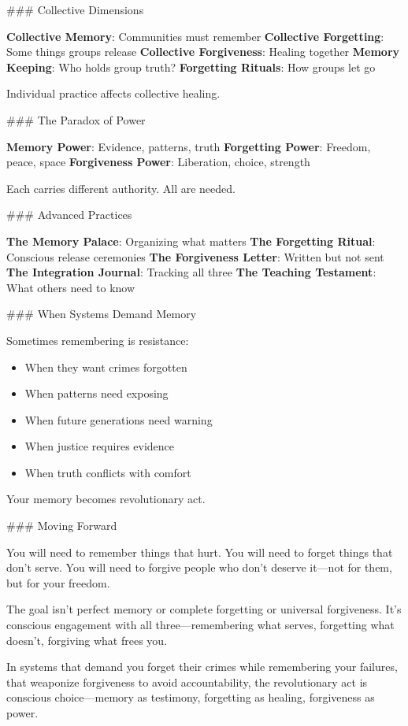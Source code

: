 \documentclass[12pt]{book}
\begin{document}
\#\#\# Collective Dimensions

\textbf{Collective Memory}: Communities must remember
\textbf{Collective Forgetting}: Some things groups release
\textbf{Collective Forgiveness}: Healing together
\textbf{Memory Keeping}: Who holds group truth?
\textbf{Forgetting Rituals}: How groups let go

Individual practice affects collective healing.

\#\#\# The Paradox of Power

\textbf{Memory Power}: Evidence, patterns, truth
\textbf{Forgetting Power}: Freedom, peace, space
\textbf{Forgiveness Power}: Liberation, choice, strength

Each carries different authority. All are needed.

\#\#\# Advanced Practices

\textbf{The Memory Palace}: Organizing what matters
\textbf{The Forgetting Ritual}: Conscious release ceremonies
\textbf{The Forgiveness Letter}: Written but not sent
\textbf{The Integration Journal}: Tracking all three
\textbf{The Teaching Testament}: What others need to know

\#\#\# When Systems Demand Memory

Sometimes remembering is resistance:

\begin{itemize}
\item When they want crimes forgotten
\item When patterns need exposing
\item When future generations need warning
\item When justice requires evidence
\item When truth conflicts with comfort

\end{itemize}
Your memory becomes revolutionary act.

\#\#\# Moving Forward

You will need to remember things that hurt. You will need to forget things that don't serve. You will need to forgive people who don't deserve it—not for them, but for your freedom.

The goal isn't perfect memory or complete forgetting or universal forgiveness. It's conscious engagement with all three—remembering what serves, forgetting what doesn't, forgiving what frees you.

In systems that demand you forget their crimes while remembering your failures, that weaponize forgiveness to avoid accountability, the revolutionary act is conscious choice—memory as testimony, forgetting as healing, forgiveness as power.
\end{document}
